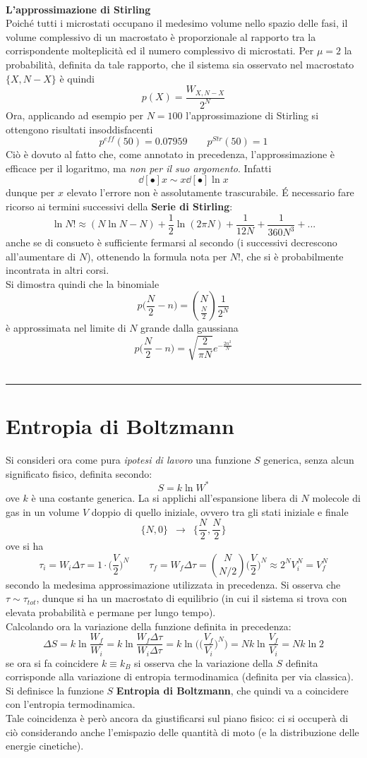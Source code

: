 \documentclass[10pt, oneside]{book}
\newcommand{\infobox}[2]{\vspace{0.5cm}~\\ \textbf{#1} \hrulefill \vspace{0.2cm}\\#2 {}\,\\\hrule \vspace{0.5cm}}
\newcommand{\ds}{\displaystyle}
\newcommand{\setel}[1]{ \{ #1\} }
\begin{document}
\infobox{L'approssimazione di Stirling}{
Poiché tutti i microstati occupano il medesimo volume nello spazio delle fasi, il volume complessivo di un macrostato è proporzionale al rapporto tra la corrispondente molteplicità ed il numero complessivo di microstati. Per $\mu=2$ la probabilità, definita da tale rapporto, che il sistema sia osservato nel macrostato $\setel{X, N-X}$ è quindi
\[p(X) = \frac{W_{X,N-X}}{2^N}\]
Ora, applicando ad esempio per $N = 100$ l'approssimazione di Stirling si ottengono risultati insoddisfacenti
\[p^{eff}(50) = 0.07959 \qquad p^{Str}(50) = 1 \]
Ciò è dovuto al fatto che, come annotato in precedenza, l'approssimazione è efficace per il logaritmo, ma \textit{non per il suo argomento}. Infatti
\[\dd[•]{x} \sim x \dd[•]{\ln x}\]
dunque per $x$ elevato l'errore non è assolutamente trascurabile. \'E necessario fare ricorso ai termini successivi della \textbf{Serie di Stirling}:
\[\ln N! \approx (N \ln N - N) + \frac{1}{2}\ln(2 \pi N) + \frac{1}{12N} + \frac{1}{360N^3}+ ...\]
anche se di consueto è sufficiente fermarsi al secondo (i successivi decrescono all'aumentare di $N$), ottenendo la formula nota per $N!$, che si è probabilmente incontrata in altri corsi.\\
Si dimostra quindi che la binomiale
\[p\big(\frac{N}{2} - n\big) = \binom{N}{\frac{N}{2}} \frac{1}{2^N}\]
è approssimata nel limite di $N$ grande dalla gaussiana
\[p\big(\frac{N}{2} - n\big) = \sqrt{\frac{2}{\pi N}} e^{\ds - \frac{2n^2}{N}}\]
}


\section{Entropia di Boltzmann}
Si consideri ora come pura \textit{ipotesi di lavoro} una funzione $S$ generica, senza alcun significato fisico, definita secondo:
\[S = k \ln W^\ast\]
ove $k$ è una costante generica. La si applichi all'espansione libera di $N$ molecole di gas in un volume $V$ doppio di quello iniziale, ovvero tra gli stati iniziale e finale
\[\setel{N,0} \enspace \longrightarrow \enspace \setel{\frac{N}{2}, \frac{N}{2}}\]
ove si ha
\[\tau_i = W_i \Delta \tau = 1 \cdot \bigg(\frac{V}{2}\bigg)^{N} \qquad \tau_f = W_f \Delta \tau = \binom{N}{N/2} \bigg(\frac{V}{2}\bigg)^{N} \approx 2^N V_i^N = V_f^N\]
secondo la medesima approssimazione utilizzata in precedenza. Si osserva che $\tau \sim \tau_{tot}$, dunque si ha un macrostato di equilibrio (in cui il sistema si trova con elevata probabilità e permane per lungo tempo).\\
Calcolando ora la variazione della funzione definita in precedenza:
\[\Delta S = k \ln\frac{W_f}{W_i} = k \ln \frac{W_f \Delta \tau}{W_i \Delta \tau} = k \ln \bigg( \bigg(\frac{V_f}{V_i}\bigg)^N \bigg) = Nk \ln \frac{V_f}{V_i} = Nk \ln2\]
se ora si fa coincidere $k \equiv k_B$ si osserva che la variazione della $S$ definita corrisponde alla variazione di entropia termodinamica (definita per via classica). Si definisce la funzione $S$ \textbf{Entropia di Boltzmann}, che quindi va a coincidere con l'entropia termodinamica.\\
Tale coincidenza è però ancora da giustificarsi sul piano fisico: ci si occuperà di ciò considerando anche l'emispazio delle quantità di moto (e la distribuzione delle energie cinetiche).
\end{document}
